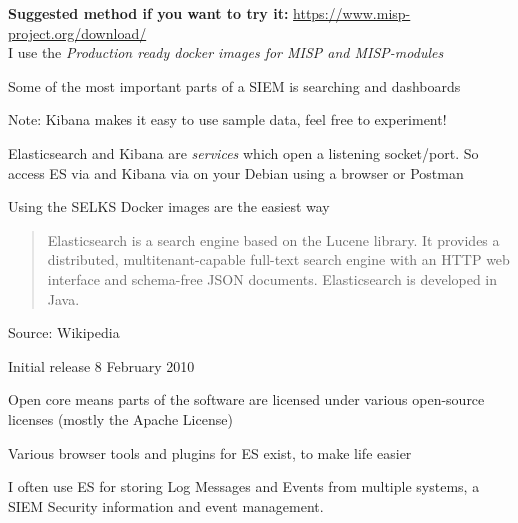 \documentclass[Screen16to9,17pt]{foils}
\begin{document}
{\bf Suggested method if you want to try it:} \url{https://www.misp-project.org/download/}\\
I use the \emph{Production ready docker images for MISP and MISP-modules }




\begin{list2}
\item Some of the most important parts of a SIEM is searching and dashboards
\end{list2}





Note: Kibana makes it easy to use sample data, feel free to experiment!

Elasticsearch and Kibana are \emph{services} which open a listening socket/port. So access ES via  and Kibana via  on your Debian using a browser or Postman

Using the SELKS Docker images are the easiest way



\begin{quote}
Elasticsearch is a search engine based on the Lucene library. It provides a distributed, multitenant-capable full-text search engine with an HTTP web interface and schema-free JSON documents. Elasticsearch is developed in Java.
\end{quote}

Source: Wikipedia 

\begin{list2}
\item Initial release	8 February 2010
\item Open core means parts of the software are licensed under various open-source licenses (mostly the Apache License)
\item Various browser tools and plugins for ES exist, to make life easier
\item I often use ES for storing Log Messages and Events from multiple systems, a SIEM Security information and event management.
\end{list2}
\end{document}
